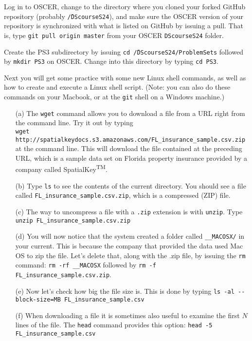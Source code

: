 \documentclass[12pt,english]{exam}
\begin{document}
\begin{questions}
\question Log in to OSCER, change to the directory where you cloned your forked GitHub repository (probably \texttt{\~/DScourseS24}), and make sure the OSCER version of your repository is synchronized with what is listed on GitHub by issuing a pull. That is, type \texttt{git pull origin master} from your OSCER \texttt{DScourseS24} folder. 

\question Create the PS3 subdirectory by issuing \texttt{cd \~/DScourseS24/ProblemSets} followed by \texttt{mkdir PS3} on OSCER. Change into this directory by typing \texttt{cd PS3}.

\question Next you will get some practice with some new Linux shell commands, as well as how to create and execute a Linux shell script. (Note: you can also do these commands on your Macbook, or at the \texttt{git} shell on a Windows machine.)
\begin{itemize}
	\item[(a)] The \texttt{wget} command allows you to download a file from a URL right from the command line. Try it out by typing\\ \texttt{wget http://spatialkeydocs.s3.amazonaws.com/FL\_insurance\_sample.csv.zip} at the command line. This will download the file contained at the preceding URL, which is a sample data set on Florida property insurance provided by a company called SpatialKey\textsuperscript{TM}.
	\item[(b)] Type \texttt{ls} to see the contents of the current directory. You should see a file called \texttt{FL\_insurance\_sample.csv.zip}, which is a compressed (ZIP) file.
	\item[(c)] The way to uncompress a file with a \texttt{.zip} extension is with \texttt{unzip}. Type \texttt{unzip FL\_insurance\_sample.csv.zip}
	\item[(d)] You will now notice that the system created a folder called \texttt{\_\_MACOSX/} in your current. This is because the company that provided the data used Mac OS to zip the file. Let's delete that, along with the .zip file, by issuing the \texttt{rm} command: \texttt{rm -rf \_\_MACOSX} followed by \texttt{rm -f FL\_insurance\_sample.csv.zip}. 
	\item[(e)] Now let's check how big the file size is. This is done by typing \texttt{ls -al -{}-block-size=MB FL\_insurance\_sample.csv}
	\item[(f)] When downloading a file it is sometimes also useful to examine the first $N$ lines of the file. The \texttt{head} command provides this option: \texttt{head -5 FL\_insurance\_sample.csv}

\end{itemize}
\end{questions}
\end{document}
